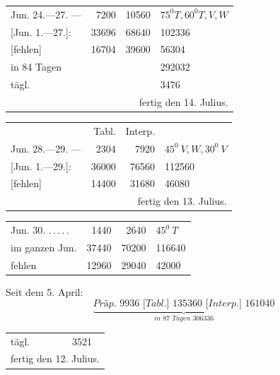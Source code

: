 \begin{center}
\begin{tabular}{@{}p{.36\linewidth}rrl@{}}
Jun. 24.—27. \BJournalDay{☿}—\BJournalDay{♄}&7200&10560&\(\mathit{75}^0 T,\mathit{60}^0 T,V,W\)\\
\hfill [Jun. 1.—27.]:&33696&68640&102336\\
\hfill [fehlen]&16704&39600&56304\\
\hfill in 84 Tagen&&&292032\\
\hfill tägl.&&&3476\\
\multicolumn{4}{r}{fertig den 14. Julius.}\\
\hline
\end{tabular}
\end{center}
\begin{center}
\begin{tabular}{@{}p{.36\linewidth}rrl@{}}
&Tabl.&Interp.&\\
Jun. 28.—29. \BJournalDay{☉}—\BJournalDay{☾}&2304&7920&\(\mathit{45}^0\ V,W,\mathit{30}^0\ V\)\\
\hfill [Jun. 1.—29.]:&36000&76560&112560\\
\hfill [fehlen]&14400&31680&46080\\
\multicolumn{4}{r}{fertig den 13. Julius.}\\
\hline
\end{tabular}
\end{center}
\begin{center}
\begin{tabular}{@{}p{.36\linewidth}rrl@{}}
Jun. 30. \BJournalDay{♂}\nobreak\hspace{.2em}\mbox{.\,.\,.\,.\,.}\hfill&1440&2640&\(\mathit{45}^0\ T\)\\
\hfill im ganzen Jun.&37440&70200&116640\\
\hfill fehlen&12960&29040&42000
\end{tabular}
\end{center}
\noindent Seit dem 5. April:
\[
\underbrace{\textit{Präp. 9936 [Tabl.] 135360 [Interp.] 161040}}_{\textstyle\textit{in 87 Tagen 306336}}
\]
\begin{center}
\begin{tabular}{@{}p{.36\linewidth}rrl@{}}
\hfill tägl.&&&3521\\
\multicolumn{4}{r}{fertig den 12. Julius.}\\
\hline
\end{tabular}
\end{center}
